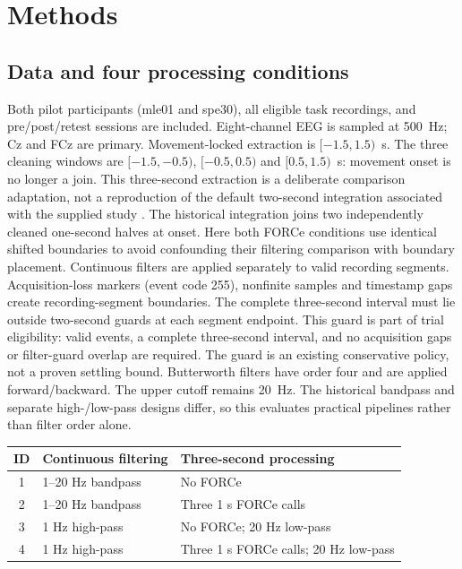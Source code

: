 \documentclass[11pt,a4paper]{article}
\begin{document}
\section{Methods}
\subsection{Data and four processing conditions}
Both pilot participants (mle01 and spe30), all eligible task recordings, and pre/post/retest sessions are included. Eight-channel EEG is sampled at 500~Hz; Cz and FCz are primary. Movement-locked extraction is $[-1.5,1.5)$~s. The three cleaning windows are $[-1.5,-0.5)$, $[-0.5,0.5)$ and $[0.5,1.5)$~s: movement onset is no longer a join. This three-second extraction is a deliberate comparison adaptation, not a reproduction of the default two-second integration associated with the supplied study \cite{graz}. The historical integration joins two independently cleaned one-second halves at onset. Here both FORCe conditions use identical shifted boundaries to avoid confounding their filtering comparison with boundary placement.
Continuous filters are applied separately to valid recording segments. Acquisition-loss markers (event code 255), nonfinite samples and timestamp gaps create recording-segment boundaries. The complete three-second interval must lie outside two-second guards at each segment endpoint. This guard is part of trial eligibility: valid events, a complete three-second interval, and no acquisition gaps or filter-guard overlap are required. The guard is an existing conservative policy, not a proven settling bound.
Butterworth filters have order four and are applied forward/backward. The upper cutoff remains 20~Hz. The historical bandpass and separate high-/low-pass designs differ, so this evaluates practical pipelines rather than filter order alone.
\begin{center}\small\begin{tabular}{cll}\toprule
ID & Continuous filtering & Three-second processing \\
\midrule
1 & 1--20 Hz bandpass & No FORCe \\
2 & 1--20 Hz bandpass & Three 1 s FORCe calls \\
3 & 1 Hz high-pass & No FORCe; 20 Hz low-pass \\
4 & 1 Hz high-pass & Three 1 s FORCe calls; 20 Hz low-pass \\
\bottomrule\end{tabular}\end{center}
\end{document}
